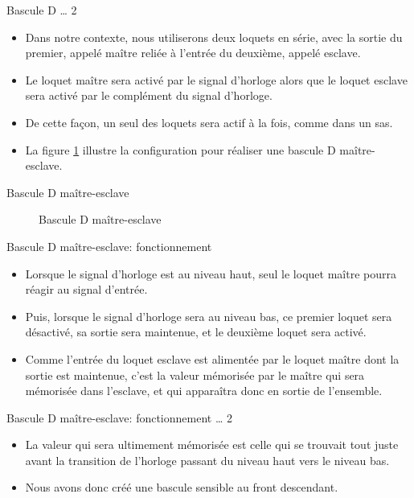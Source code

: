 \documentclass[presentation]{beamer}
\begin{document}
\begin{frame}[label={sec:orgd653ebb}]{Bascule D \ldots{} 2}
\begin{itemize}
\item Dans notre contexte, nous utiliserons deux loquets en série, avec la sortie du premier, appelé \alert{maître} reliée à l'entrée du deuxième, appelé \alert{esclave}.

\item Le loquet maître sera activé par le signal d'horloge alors que le loquet esclave sera activé par le complément du signal d'horloge.

\item De cette façon, un seul des loquets sera actif à la fois, comme dans un sas.

\item La figure \ref{fig:org1bef66f} illustre la configuration pour réaliser une bascule D maître-esclave.
\end{itemize}
\end{frame}

\begin{frame}[label={sec:org7752e28}]{Bascule D maître-esclave}
\begin{figure}[htbp]
\centering

\caption{\label{fig:org1bef66f}Bascule D maître-esclave}
\end{figure}
\end{frame}

\begin{frame}[label={sec:org2bbb95f}]{Bascule D maître-esclave: fonctionnement}
\begin{itemize}
\item Lorsque le signal d'horloge est au niveau haut, seul le loquet maître pourra réagir au signal d'entrée.

\item Puis, lorsque le signal d'horloge sera au niveau bas, ce premier loquet sera désactivé, sa sortie sera maintenue, et le deuxième loquet sera activé.

\item Comme l'entrée du loquet esclave est alimentée par le loquet maître dont la sortie est maintenue, c'est la valeur mémorisée par le maître qui sera mémorisée dans l'esclave, et qui apparaîtra donc en sortie de l'ensemble.
\end{itemize}
\end{frame}

\begin{frame}[label={sec:org06e87bd}]{Bascule D maître-esclave: fonctionnement \ldots{} 2}
\begin{itemize}
\item La valeur qui sera ultimement mémorisée est celle qui se trouvait tout juste avant la transition de l'horloge passant du niveau haut vers le niveau bas.

\item Nous avons donc créé une bascule sensible au \alert{front descendant}.
\end{itemize}
\end{frame}
\end{document}
